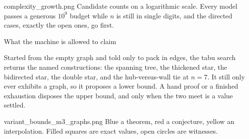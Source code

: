 \documentclass[aspectratio=1610,11pt]{beamer}
\begin{document}
  {complexity_growth.png}
  {Candidate counts on a logarithmic scale. Every model passes a generous $10^9$ budget while $n$ is still in single digits, and the directed cases, exactly the open ones, go first.}

\begin{frame}{What the machine is allowed to claim}
\vfill
\centering
{\scriptsize}

\vspace{12pt}
\begin{minipage}{0.9\textwidth}
{\footnotesize\color{black!60} Started from the empty graph and told only to pack in edges, the tabu search returns the named constructions: the spanning tree, the thickened star, the bidirected star, the double star, and the hub-versus-wall tie at $n=7$. It still only ever exhibits a graph, so it proposes a lower bound. A hand proof or a finished exhaustion disposes the upper bound, and only when the two meet is a value settled.}
\end{minipage}
\vfill
\end{frame}

  {variant_bounds_m3_graphs.png}
  {Blue a theorem, red a conjecture, yellow an interpolation. Filled squares are exact values, open circles are witnesses.}
\end{document}

